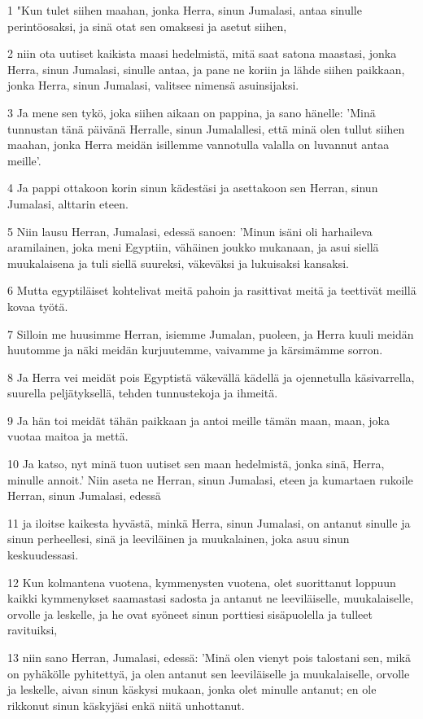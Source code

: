 \par 1 "Kun tulet siihen maahan, jonka Herra, sinun Jumalasi, antaa sinulle perintöosaksi, ja sinä otat sen omaksesi ja asetut siihen,
\par 2 niin ota uutiset kaikista maasi hedelmistä, mitä saat satona maastasi, jonka Herra, sinun Jumalasi, sinulle antaa, ja pane ne koriin ja lähde siihen paikkaan, jonka Herra, sinun Jumalasi, valitsee nimensä asuinsijaksi.
\par 3 Ja mene sen tykö, joka siihen aikaan on pappina, ja sano hänelle: 'Minä tunnustan tänä päivänä Herralle, sinun Jumalallesi, että minä olen tullut siihen maahan, jonka Herra meidän isillemme vannotulla valalla on luvannut antaa meille'.
\par 4 Ja pappi ottakoon korin sinun kädestäsi ja asettakoon sen Herran, sinun Jumalasi, alttarin eteen.
\par 5 Niin lausu Herran, Jumalasi, edessä sanoen: 'Minun isäni oli harhaileva aramilainen, joka meni Egyptiin, vähäinen joukko mukanaan, ja asui siellä muukalaisena ja tuli siellä suureksi, väkeväksi ja lukuisaksi kansaksi.
\par 6 Mutta egyptiläiset kohtelivat meitä pahoin ja rasittivat meitä ja teettivät meillä kovaa työtä.
\par 7 Silloin me huusimme Herran, isiemme Jumalan, puoleen, ja Herra kuuli meidän huutomme ja näki meidän kurjuutemme, vaivamme ja kärsimämme sorron.
\par 8 Ja Herra vei meidät pois Egyptistä väkevällä kädellä ja ojennetulla käsivarrella, suurella peljätyksellä, tehden tunnustekoja ja ihmeitä.
\par 9 Ja hän toi meidät tähän paikkaan ja antoi meille tämän maan, maan, joka vuotaa maitoa ja mettä.
\par 10 Ja katso, nyt minä tuon uutiset sen maan hedelmistä, jonka sinä, Herra, minulle annoit.' Niin aseta ne Herran, sinun Jumalasi, eteen ja kumartaen rukoile Herran, sinun Jumalasi, edessä
\par 11 ja iloitse kaikesta hyvästä, minkä Herra, sinun Jumalasi, on antanut sinulle ja sinun perheellesi, sinä ja leeviläinen ja muukalainen, joka asuu sinun keskuudessasi.
\par 12 Kun kolmantena vuotena, kymmenysten vuotena, olet suorittanut loppuun kaikki kymmenykset saamastasi sadosta ja antanut ne leeviläiselle, muukalaiselle, orvolle ja leskelle, ja he ovat syöneet sinun porttiesi sisäpuolella ja tulleet ravituiksi,
\par 13 niin sano Herran, Jumalasi, edessä: 'Minä olen vienyt pois talostani sen, mikä on pyhäkölle pyhitettyä, ja olen antanut sen leeviläiselle ja muukalaiselle, orvolle ja leskelle, aivan sinun käskysi mukaan, jonka olet minulle antanut; en ole rikkonut sinun käskyjäsi enkä niitä unhottanut.
